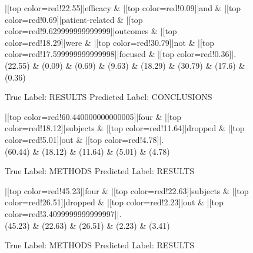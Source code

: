 \documentclass[a4paper, landscape]{article}
\begin{document}
\begin{figure}
\begin{center}
\begin{dependency}
\begin{deptext}
|[top color=red!22.55]|efficacy \& |[top color=red!0.09]|and \& |[top color=red!0.69]|patient-related \& |[top color=red!9.629999999999999]|outcomes \& |[top color=red!18.29]|were \& |[top color=red!30.79]|not \& |[top color=red!17.599999999999998]|focused \& |[top color=red!0.36]|.\\
(22.55) \& (0.09) \& (0.69) \& (9.63) \& (18.29) \& (30.79) \& (17.6) \& (0.36)\\
\end{deptext}
\end{dependency}
\end{center}
\caption{True Label: RESULTS Predicted Label: CONCLUSIONS}
\end{figure}
\clearpage
\begin{figure}
\begin{center}
\begin{dependency}
\begin{deptext}
|[top color=red!60.440000000000005]|four \& |[top color=red!18.12]|subjects \& |[top color=red!11.64]|dropped \& |[top color=red!5.01]|out \& |[top color=red!4.78]|.\\
(60.44) \& (18.12) \& (11.64) \& (5.01) \& (4.78)\\
\end{deptext}
\end{dependency}
\end{center}
\caption{True Label: METHODS Predicted Label: RESULTS}
\end{figure}
\clearpage
\begin{figure}
\begin{center}
\begin{dependency}
\begin{deptext}
|[top color=red!45.23]|four \& |[top color=red!22.63]|subjects \& |[top color=red!26.51]|dropped \& |[top color=red!2.23]|out \& |[top color=red!3.4099999999999997]|.\\
(45.23) \& (22.63) \& (26.51) \& (2.23) \& (3.41)\\
\end{deptext}
\end{dependency}
\end{center}
\caption{True Label: METHODS Predicted Label: RESULTS}
\end{figure}
\end{document}

